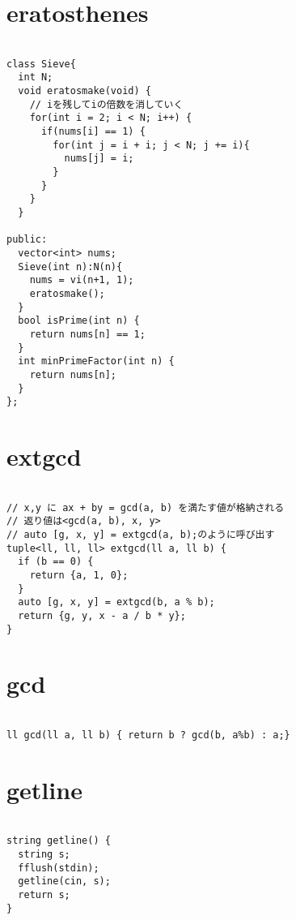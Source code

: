 \documentclass{jsarticle}
\begin{document}
\color{white}
\section{eratosthenes}
\color{black}
\begin{lstlisting}[caption=eratosthenes]

class Sieve{
  int N;
  void eratosmake(void) {
    // iを残してiの倍数を消していく
    for(int i = 2; i < N; i++) {
      if(nums[i] == 1) {
        for(int j = i + i; j < N; j += i){
          nums[j] = i;
        }
      }
    }
  }

public:
  vector<int> nums;
  Sieve(int n):N(n){
    nums = vi(n+1, 1);
    eratosmake();
  }
  bool isPrime(int n) {
    return nums[n] == 1;
  }
  int minPrimeFactor(int n) {
    return nums[n];
  }
};

\end{lstlisting}

\color{white}
\section{extgcd}
\color{black}
\begin{lstlisting}[caption=extgcd]

// x,y に ax + by = gcd(a, b) を満たす値が格納される
// 返り値は<gcd(a, b), x, y>
// auto [g, x, y] = extgcd(a, b);のように呼び出す
tuple<ll, ll, ll> extgcd(ll a, ll b) {
  if (b == 0) {
    return {a, 1, 0};
  }
  auto [g, x, y] = extgcd(b, a % b);
  return {g, y, x - a / b * y};
}

\end{lstlisting}

\color{white}
\section{gcd}
\color{black}
\begin{lstlisting}[caption=gcd]

ll gcd(ll a, ll b) { return b ? gcd(b, a%b) : a;}

\end{lstlisting}

\color{white}
\section{getline}
\color{black}
\begin{lstlisting}[caption=getline]

string getline() {
  string s;
  fflush(stdin);
  getline(cin, s);
  return s;
}

\end{lstlisting}
\end{document}
